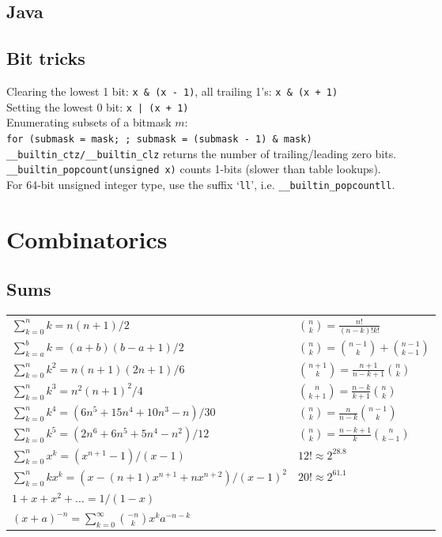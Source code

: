 \documentclass[12pt]{extarticle}
\begin{document}
\begin{multicols*}{2}
\subsection{Java} %



\subsection{Bit tricks}
Clearing the lowest 1 bit: \verb$x & (x - 1)$, all trailing 1's: \verb$x & (x + 1)$ \\
Setting the lowest 0 bit: \verb$x | (x + 1)$ \\
Enumerating subsets of a bitmask $m$: \\
\verb|for (submask = mask; ; submask = (submask - 1) & mask)| \\
\verb$__builtin_ctz/__builtin_clz$ returns the number of trailing/leading zero bits. \\
\verb$__builtin_popcount(unsigned x)$ counts 1-bits (slower than table lookups). \\
For 64-bit unsigned integer type, use the suffix `\verb$ll$', i.e. \verb$__builtin_popcountll$.



\section{Combinatorics}

\subsection{Sums}

\begin{tabular}{l l}
    $\sum_{k=0}^n k = n(n+1)/2$		& ${n \choose k} = \frac{n!}{(n-k)!k!}$ \\
    $\sum_{k=a}^b k = (a+b)(b-a+1)/2$   & ${n \choose k} = {n-1 \choose k} + {n-1 \choose k-1}$ \\
    $\sum_{k=0}^n k^2 = n(n+1)(2n+1)/6$ & ${n+1 \choose k} = \frac{n+1}{n-k+1} {n \choose k}$   \\
    $\sum_{k=0}^n k^3 = n^2(n+1)^2/4$   & ${n \choose k+1} = \frac{n-k}{k+1} {n \choose k}$     \\
    $\sum_{k=0}^n k^4 = (6n^5 + 15n^4 + 10n^3 - n)/30$  & ${n \choose k} = \frac{n}{n-k} {n-1 \choose k}$       \\
    $\sum_{k=0}^n k^5 = (2n^6 + 6n^5 + 5n^4 - n^2)/12$  & ${n \choose k} = \frac{n-k+1}{k} {n \choose k-1}$     \\
    $\sum_{k=0}^n x^k = (x^{n+1} - 1)/(x - 1)$  & $12! \approx 2^{28.8}$ \\
    $\sum_{k=0}^n kx^k = (x - (n+1)x^{n+1} + nx^{n+2})/(x-1)^2$	& $20! \approx 2^{61.1}$ \\
    $1 + x + x^2 + \dots = 1 / (1 - x)$ \\
    $(x+a)^{-n} = \sum_{k=0}^{\infty} {-n \choose k} x^k a^{-n-k}$ \\
\end{tabular}


\end{multicols*}
\end{document}
